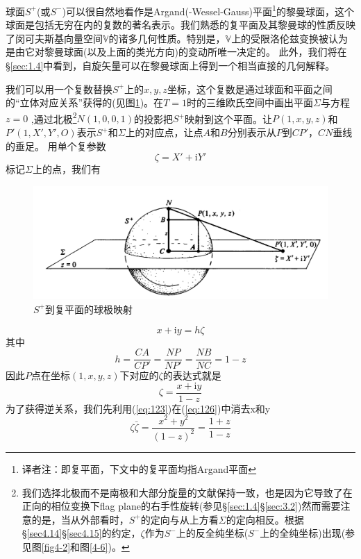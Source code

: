 \documentclass[utf8]{ctexbook}
\numberwithin{equation}{section}
\begin{document}
球面$S^+$(或$S^-$)可以很自然地看作是Argand(-Wessel-Gauss)平面\footnote{译者注：即复平面，下文中的复平面均指Argand平面}的黎曼球面，这个球面是包括无穷在内的复数的著名表示。我们熟悉的复平面及其黎曼球的性质反映了闵可夫斯基向量空间$\mathbb{V}$的诸多几何性质。特别是，$\mathbb{V}$上的受限洛伦兹变换被认为是由它对黎曼球面(以及上面的类光方向)的变动所唯一决定的。
此外，我们将在\S \ref{sec:1.4}中看到，自旋矢量可以在黎曼球面上得到一个相当直接的几何解释。

我们可以用一个复数替换$S^+$上的$x, y, z$坐标，这个复数是通过球面和平面之间的“立体对应关系”获得的(见图\ref{fig:1-3})。在$T=1$时的三维欧氏空间中画出平面$\Sigma$与方程$z = 0$ ,通过北极\footnote{我们选择北极而不是南极和大部分旋量的文献保持一致，也是因为它导致了在正向的相位变换下flag plane的右手性旋转(参见\S\ref{sec:1.4}\S\ref{sec:3.2})然而需要注意的是，当从外部看时，$S^+$的定向与从上方看$\Sigma$的定向相反。根据\S\ref{sec4.14}\S\ref{sec4.15}的约定，$\zeta$作为$S^-$上的反全纯坐标($S^-$上的全纯坐标)出现(参见图\ref{fig4-2}和图\ref{4-6})。}$N(1,0,0,1)$的投影把$S^+$映射到这个平面。让$P (1, x, y,z)$和$P'(1,X',Y',O)$表示$S^+$和$\Sigma$上的对应点，让点$A$和$B$分别表示从$P$到$CP'$，$CN$垂线的垂足。
用单个复参数
\begin{equation}
    \zeta=X'+\mathrm{i}Y'\label{eq:124}
\end{equation}
标记$\Sigma$上的点，我们有
\begin{figure}
    \centering
    \includegraphics[width=12cm]{fig1-3.png}
    \caption{$S^+$到复平面的球极映射}\label{fig:1-3}
\end{figure}
\begin{equation}
    x+\mathrm{i}y=h\zeta\label{eq:125}
\end{equation}
其中
\[h=\frac{CA}{CP'}=\frac{NP}{NP'}=\frac{NB}{NC}=1-z\]
因此$P$点在坐标$(1,x,y,z)$下对应的$\zeta$的表达式就是
\begin{equation}
    \zeta =\frac{x+\mathrm{i}y}{1-z}\label{eq:126}
\end{equation}
为了获得逆关系，我们先利用(\ref{eq:123})在(\ref{eq:126})中消去x和y
\begin{equation}
    \zeta\bar{\zeta}=\frac{x^2+y^2}{(1-z)^2} =\frac{1+z}{1-z}\label{eq:127}
\end{equation}
\end{document}
